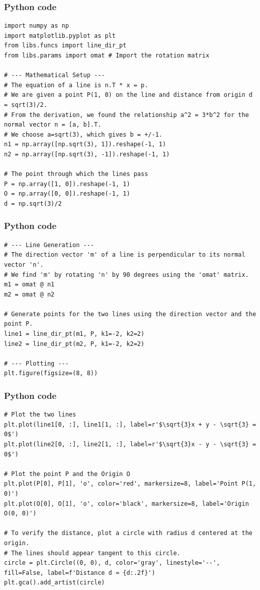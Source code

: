 \documentclass{beamer}
\begin{document}
\begin{frame}[fragile]
\frametitle{Python code}
\begin{lstlisting}
import numpy as np
import matplotlib.pyplot as plt
from libs.funcs import line_dir_pt
from libs.params import omat # Import the rotation matrix

# --- Mathematical Setup ---
# The equation of a line is n.T * x = p.
# We are given a point P(1, 0) on the line and distance from origin d = sqrt(3)/2.
# From the derivation, we found the relationship a^2 = 3*b^2 for the normal vector n = [a, b].T.
# We choose a=sqrt(3), which gives b = +/-1.
n1 = np.array([np.sqrt(3), 1]).reshape(-1, 1)
n2 = np.array([np.sqrt(3), -1]).reshape(-1, 1)

# The point through which the lines pass
P = np.array([1, 0]).reshape(-1, 1)
O = np.array([0, 0]).reshape(-1, 1)
d = np.sqrt(3)/2
\end{lstlisting}    
\end{frame}
\begin{frame}[fragile]
\frametitle{Python code}
\begin{lstlisting}
# --- Line Generation ---
# The direction vector 'm' of a line is perpendicular to its normal vector 'n'.
# We find 'm' by rotating 'n' by 90 degrees using the 'omat' matrix.
m1 = omat @ n1
m2 = omat @ n2

# Generate points for the two lines using the direction vector and the point P.
line1 = line_dir_pt(m1, P, k1=-2, k2=2)
line2 = line_dir_pt(m2, P, k1=-2, k2=2)

# --- Plotting ---
plt.figure(figsize=(8, 8))
\end{lstlisting}    
\end{frame}
\begin{frame}[fragile]
\frametitle{Python code}
\begin{lstlisting}
# Plot the two lines
plt.plot(line1[0, :], line1[1, :], label=r'$\sqrt{3}x + y - \sqrt{3} = 0$')
plt.plot(line2[0, :], line2[1, :], label=r'$\sqrt{3}x - y - \sqrt{3} = 0$')

# Plot the point P and the Origin O
plt.plot(P[0], P[1], 'o', color='red', markersize=8, label='Point P(1, 0)')
plt.plot(O[0], O[1], 'o', color='black', markersize=8, label='Origin O(0, 0)')

# To verify the distance, plot a circle with radius d centered at the origin.
# The lines should appear tangent to this circle.
circle = plt.Circle((0, 0), d, color='gray', linestyle='--', fill=False, label=f'Distance d ≈ {d:.2f}')
plt.gca().add_artist(circle)
\end{lstlisting}    
\end{frame}
\end{document}
